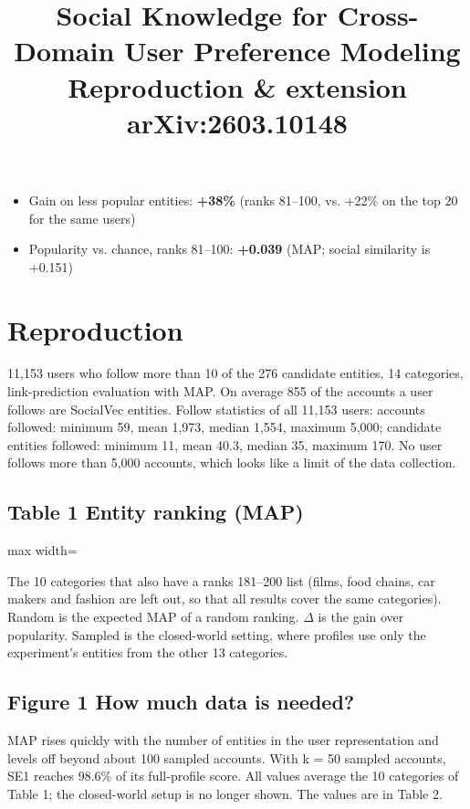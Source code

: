 \documentclass[10pt]{article}
\begin{document}
\title{Social Knowledge for Cross-Domain User Preference Modeling\\[4pt]\large Reproduction \& extension \textperiodcentered{} arXiv:2603.10148}
\date{}
\maketitle
\begin{itemize}
  \item Gain on less popular entities: \textbf{+38\%} (ranks 81--100, vs. +22\% on the top 20 for the same users)
  \item Popularity vs. chance, ranks 81--100: \textbf{+0.039} (MAP; social similarity is +0.151)
\end{itemize}
\section{Reproduction}
11,153 users who follow more than 10 of the 276 candidate entities, 14 categories, link-prediction evaluation with MAP. On average 855 of the accounts a user follows are SocialVec entities. Follow statistics of all 11,153 users: accounts followed: minimum 59, mean 1,973, median 1,554, maximum 5,000; candidate entities followed: minimum 11, mean 40.3, median 35, maximum 170. No user follows more than 5,000 accounts, which looks like a limit of the data collection.

\subsection*{Table 1 \textperiodcentered{} Entity ranking (MAP)}
\begin{center}\begin{adjustbox}{max width=\linewidth}

\end{adjustbox}\end{center}

{\small The 10 categories that also have a ranks 181--200 list (films, food chains, car makers and fashion are left out, so that all results cover the same categories). Random is the expected MAP of a random ranking. $\Delta$ is the gain over popularity. Sampled is the closed-world setting, where profiles use only the experiment's entities from the other 13 categories.}

\subsection*{Figure 1 \textperiodcentered{} How much data is needed?}
MAP rises quickly with the number of entities in the user representation and levels off beyond about 100 sampled accounts. With k = 50 sampled accounts, SE1 reaches 98.6\% of its full-profile score. All values average the 10 categories of Table 1; the closed-world setup is no longer shown. The values are in Table 2.
\end{document}
